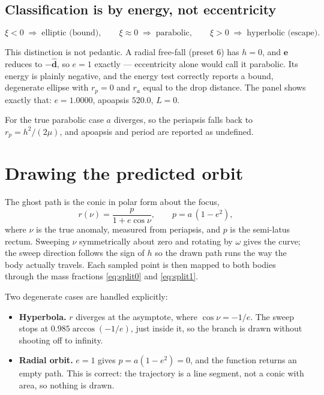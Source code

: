 \documentclass[11pt,a4paper]{article}
\newcommand{\ve}{\mathbf{e}}
\newcommand{\dhat}{\hat{\mathbf{d}}}
\begin{document}
\subsection{Classification is by energy, not eccentricity}

\[
  \xi < 0 \;\Rightarrow\; \text{elliptic (bound)},\qquad
  \xi \approx 0 \;\Rightarrow\; \text{parabolic},\qquad
  \xi > 0 \;\Rightarrow\; \text{hyperbolic (escape)} .
\]

This distinction is not pedantic. A radial free-fall (preset 6) has $h = 0$, and
$\ve$ reduces to $-\dhat$, so $e = 1$ exactly --- eccentricity alone would call
it parabolic. Its energy is plainly negative, and the energy test correctly
reports a bound, degenerate ellipse with $r_p = 0$ and $r_a$ equal to the drop
distance. The panel shows exactly that: $e = 1.0000$, apoapsis $520.0$,
$L = 0$.

For the true parabolic case $a$ diverges, so the periapsis falls back to
$r_p = h^{2}/(2\mu)$, and apoapsis and period are reported as undefined.

\section{Drawing the predicted orbit}

The ghost path is the conic in polar form about the focus,
\[
  r(\nu) = \frac{p}{1 + e\cos\nu},
  \qquad p = a\,(1-e^{2}),
\]
where $\nu$ is the true anomaly, measured from periapsis, and $p$ is the
semi-latus rectum. Sweeping $\nu$ symmetrically about zero and rotating by
$\omega$ gives the curve; the sweep direction follows the sign of $h$ so the
drawn path runs the way the body actually travels. Each sampled point is then
mapped to both bodies through the mass fractions \eqref{eq:split0} and
\eqref{eq:split1}.

Two degenerate cases are handled explicitly:

\begin{itemize}\itemsep3pt
  \item \textbf{Hyperbola.} $r$ diverges at the asymptote, where
    $\cos\nu = -1/e$. The sweep stops at $0.985\arccos(-1/e)$, just inside it,
    so the branch is drawn without shooting off to infinity.
  \item \textbf{Radial orbit.} $e = 1$ gives $p = a(1-e^{2}) = 0$, and the
    function returns an empty path. This is correct: the trajectory is a line
    segment, not a conic with area, so nothing is drawn.
\end{itemize}
\end{document}
